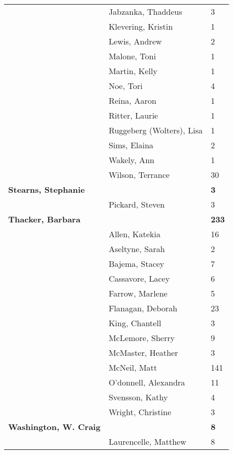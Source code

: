\documentclass{article}\usepackage[]{graphicx}\usepackage[]{color}
\begin{document}
{\begin{longtable} { >{\raggedright}p{}|p{}p{}}
   \rowcolor[gray]{0.90} & Jabzanka, Thaddeus & 3 \\ 
   \rowcolor[gray]{0.90} & Klevering, Kristin & 1 \\ 
   & Lewis, Andrew & 2 \\ 
   & Malone, Toni & 1 \\ 
   & Martin, Kelly & 1 \\ 
   \rowcolor[gray]{0.90} & Noe, Tori & 4 \\ 
   \rowcolor[gray]{0.90} & Reina, Aaron & 1 \\ 
   \rowcolor[gray]{0.90} & Ritter, Laurie & 1 \\ 
   & Ruggeberg (Wolters), Lisa & 1 \\ 
   & Sims, Elaina & 2 \\ 
   & Wakely, Ann & 1 \\ 
   \rowcolor[gray]{0.90} & Wilson, Terrance & 30 \\ 
   \rowcolor[gray]{0.90}\textbf{Stearns, Stephanie} &  & \hspace{2cm}\textbf{3} \\ 
   \rowcolor[gray]{0.90} & Pickard, Steven & 3 \\ 
  \textbf{Thacker, Barbara} &  & \hspace{2cm}\textbf{233} \\ 
   & Allen, Katekia & 16 \\ 
   & Aseltyne, Sarah & 2 \\ 
   \rowcolor[gray]{0.90} & Bajema, Stacey & 7 \\ 
   \rowcolor[gray]{0.90} & Cassavore, Lacey & 6 \\ 
   \rowcolor[gray]{0.90} & Farrow, Marlene & 5 \\ 
   & Flanagan, Deborah & 23 \\ 
   & King, Chantell & 3 \\ 
   & McLemore, Sherry & 9 \\ 
   \rowcolor[gray]{0.90} & McMaster, Heather & 3 \\ 
   \rowcolor[gray]{0.90} & McNeil, Matt & 141 \\ 
   \rowcolor[gray]{0.90} & O'donnell, Alexandra & 11 \\ 
   & Svensson, Kathy & 4 \\ 
   & Wright, Christine & 3 \\ 
  \textbf{Washington, W. Craig} &  & \hspace{2cm}\textbf{8} \\ 
   \rowcolor[gray]{0.90} & Laurencelle, Matthew & 8 \\ 

\end{longtable}}
\end{document}
